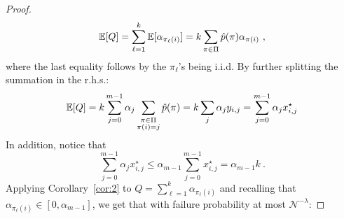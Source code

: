 \documentclass[letterpaper]{article} %
\theoremstyle{definition}
\newcommand{\NN}{\mathcal{N}}
\newcommand{\EE}{\mathbb{E}}
\begin{document}
\begin{proof}
\begin{equation*}
\EE[Q] = \sum_{\ell=1}^{k} \EE[\alpha_{\pi_{\ell}(i)}]\\
=k \sum_{\pi \in \Pi} \hat{p}(\pi)\alpha_{\pi(i)}\ ,
\end{equation*}
where the last equality follows by the $\pi_{\ell}$'s being i.i.d. By further splitting the summation in the r.h.s.:
\begin{equation*}
\EE[Q] =  k \sum_{j=0}^{m-1} \alpha_{j}\sum_{\substack{{\pi \in \Pi}\\\pi(i)=j }} \hat{p}(\pi)\\
=  k \sum_j \alpha_{j} y_{i,j}\\
=  \sum_{j=0}^{m-1} \alpha_{j} x^\star_{i,j}\\
\end{equation*}
	In addition, notice that 
	\begin{equation}\label{eq:tttt}
		\sum_{j=0}^{m-1} \alpha_{j} x^\star_{i,j} \leq \alpha_{m-1}\sum_{j=0}^{m-1}x^\star_{i,j}= \alpha_{m-1}k\ .
	\end{equation}
	Applying Corollary~\ref{cor:2} to $Q=\sum_{\ell=1}^{k}\alpha_{\pi_{\ell}(i)}$ and recalling that $\alpha_{\pi_{\ell}(i)} \in [0,\alpha_{m-1}]$, we get that with   failure probability at most $\NN^{-\lambda}$:

\end{proof}
\end{document}
